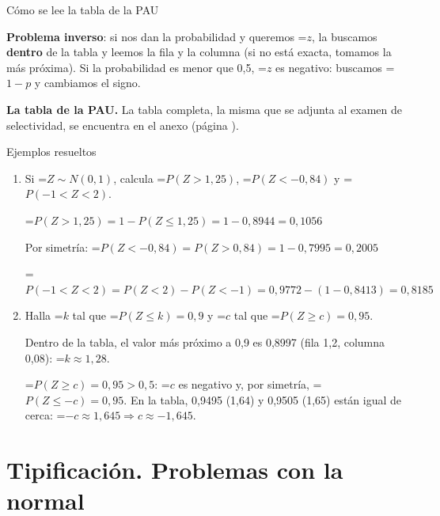 \documentclass[11pt,a4paper]{article}
\newcommand{\lt}{<}\newcommand{\gt}{>}
\newcommand{\fmm}[1]{\setbox0=\hbox{$#1$}\ifdim\wd0>\linewidth\[#1\]\else\mbox{\box0}\fi}
\newcommand{\fmuline}[1]{\textbf{\color{fmaccent}#1}}
\begin{document}
\begin{fmdef}{Cómo se lee la tabla de la PAU}
      
\begin{fmnote}\fmuline{Problema inverso}: si nos dan la probabilidad y queremos \fmm{z}, la buscamos \textbf{dentro} de la tabla y leemos la fila y la columna (si no está exacta, tomamos la más próxima). Si la probabilidad es menor que 0,5, \fmm{z} es negativo: buscamos \fmm{1-p} y cambiamos el signo.\end{fmnote}
\end{fmdef}

  
\begin{fmnote}\textbf{La tabla de la PAU.} La tabla completa, la misma que se adjunta al examen de selectividad, se encuentra en el anexo (página \pageref{tnorm}).\end{fmnote}

  
\begin{fmex}{Ejemplos resueltos}
\begin{enumerate}[label=\textbf{\arabic*.},leftmargin=*]
\item Si \fmm{Z\sim N(0,1)}, calcula \fmm{P(Z\gt1{,}25)}, \fmm{P(Z\lt-0{,}84)} y \fmm{P(-1\lt Z\lt2)}.
          

            

\fmm{P(Z\gt1{,}25)=1-P(Z\leq1{,}25)=1-0{,}8944=0{,}1056}

            

Por simetría: \fmm{P(Z\lt-0{,}84)=P(Z\gt0{,}84)=1-0{,}7995=0{,}2005}

            

\fmm{P(-1\lt Z\lt2)=P(Z\lt2)-P(Z\lt-1)=0{,}9772-(1-0{,}8413)=0{,}8185}
\item Halla \fmm{k} tal que \fmm{P(Z\leq k)=0{,}9} y \fmm{c} tal que \fmm{P(Z\geq c)=0{,}95}.
          

            

Dentro de la tabla, el valor más próximo a 0,9 es 0,8997 (fila 1,2, columna 0,08): \fmm{k\approx1{,}28}.

            

\fmm{P(Z\geq c)=0{,}95\gt0{,}5}: \fmm{c} es negativo y, por simetría, \fmm{P(Z\leq-c)=0{,}95}. En la tabla, 0,9495 (1,64) y 0,9505 (1,65) están igual de cerca: \fmm{-c\approx1{,}645\Rightarrow c\approx-1{,}645}.
\end{enumerate}
\end{fmex}

  
\section{Tipificación. Problemas con la normal}\hypertarget{sec7}{}
\end{document}
